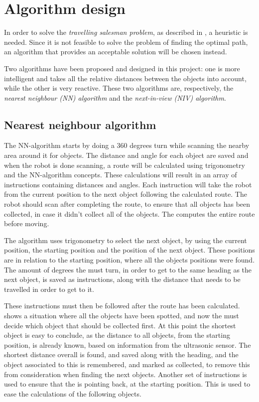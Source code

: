 \section{Algorithm design} \label{sec:algorithm-design}

In order to solve the \emph{travelling salesman problem}, as described in , a heuristic is needed. Since it is not feasible to solve the problem of finding the optimal path, an algorithm that provides an acceptable solution will be chosen instead.

Two algorithms have been proposed and designed in this project: one is more intelligent and takes all the relative distances between the objects into account, while the other is very reactive. These two algorithms are, respectively, the \emph{nearest neighbour (NN) algorithm} and the \emph{next-in-view (NIV) algorithm}.


\subsection{Nearest neighbour algorithm} \label{sec:nn-algorithm}
The NN-algorithm starts by doing a 360 degrees turn while scanning the nearby area around it for objects. The distance and angle for each object are saved and when the robot is done scanning, a route will be calculated using trigonometry and the NN-algorithm concepts. These calculations will result in an array of instructions containing distances and angles. Each instruction will take the robot from the current position to the next object following the calculated route. The robot should scan after completing the route, to ensure that all objects has been collected, in case it didn't collect all of the objects. The \projname{} computes the entire route before moving.

The algorithm uses trigonometry to select the next object, by using the current position, the starting position and the position of the next object. These positions are in relation to the starting position, where all the objects positions were found. The amount of degrees the \projname{} must turn, in order to get to the same heading as the next object, is saved as instructions, along with the distance that needs to be travelled in order to get to it. 

These instructions must then be followed after the route has been calculated.  shows a situation where all the objects have been spotted, and now the \projname{} must decide which object that should be collected first. At this point the shortest object is easy to conclude, as the distance to all objects, from the starting position, is already known, based on information from the ultrasonic sensor. The shortest distance overall is found, and saved along with the heading, and the object associated to this is remembered, and marked as collected, to remove this from consideration when finding the next objects. Another set of instructions is used to ensure that the \projname{} is pointing back, at the starting position. This is used to ease the calculations of the following objects. 

